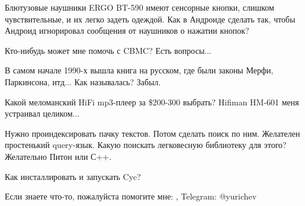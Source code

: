 \myhrule{}

Блютузовые наушники ERGO BT-590 имеют сенсорные кнопки, слишком чувствительные, и их легко задеть одеждой.
Как в Андроиде сделать так, чтобы Андроид игнорировал сообщения от наушников о нажатии кнопок?

\myhrule{}

Кто-нибудь может мне помочь с CBMC? Есть вопросы...

\myhrule{}

В самом начале 1990-х вышла книга на русском, где были законы Мерфи, Паркинсона, итд...
Как называлась?
Забыл.

\myhrule{}

Какой меломанский HiFi mp3-плеер за \$200-300 выбрать?
Hifiman HM-601 меня устраивал целиком...

\myhrule{}

Нужно проиндексировать пачку текстов. Потом сделать поиск по ним. Желателен простенький query-язык.
Какую поискать легковесную библиотеку для этого?
Желательно Питон или С++.

\myhrule{}

Как инсталлировать и запускать Cyc?

\myhrule{}

Если знаете что-то, пожалуйста помогите мне: \EMAIL{}, Telegram: @yurichev
